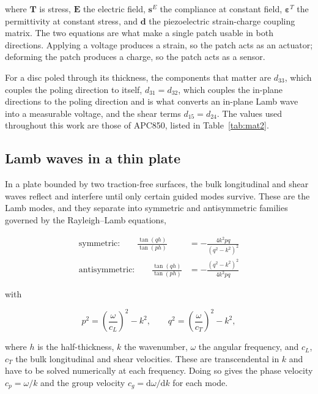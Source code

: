 where $\mathbf{T}$ is stress, $\mathbf{E}$ the electric field, $\mathbf{s}^{E}$ the compliance at constant
field, $\boldsymbol{\varepsilon}^{T}$ the permittivity at constant stress, and $\mathbf{d}$ the piezoelectric
strain-charge coupling matrix. The two equations are what make a single patch usable in both directions.
Applying a voltage produces a strain, so the patch acts as an actuator; deforming the patch produces a charge,
so the patch acts as a sensor.

For a disc poled through its thickness, the components that matter are $d_{33}$, which couples the poling
direction to itself, $d_{31}=d_{32}$, which couples the in-plane directions to the poling direction and is
what converts an in-plane Lamb wave into a measurable voltage, and the shear terms $d_{15}=d_{24}$. The
values used throughout this work are those of APC850, listed in Table~\ref{tab:mat2}.

\subsection{Lamb waves in a thin plate}

In a plate bounded by two traction-free surfaces, the bulk longitudinal and shear waves reflect and interfere
until only certain guided modes survive. These are the Lamb modes, and they separate into symmetric and
antisymmetric families governed by the Rayleigh--Lamb equations,

\begin{align}
  \text{symmetric:}\qquad
  \frac{\tan(qh)}{\tan(ph)} &= -\frac{4k^{2}pq}{\left(q^{2}-k^{2}\right)^{2}} \\[4pt]
  \text{antisymmetric:}\qquad
  \frac{\tan(qh)}{\tan(ph)} &= -\frac{\left(q^{2}-k^{2}\right)^{2}}{4k^{2}pq}
\end{align}

with

\begin{equation}
  p^{2} = \left(\frac{\omega}{c_{L}}\right)^{2} - k^{2}, \qquad
  q^{2} = \left(\frac{\omega}{c_{T}}\right)^{2} - k^{2},
\end{equation}

where $h$ is the half-thickness, $k$ the wavenumber, $\omega$ the angular frequency, and $c_{L}$, $c_{T}$
the bulk longitudinal and shear velocities. These are transcendental in $k$ and have to be solved numerically
at each frequency. Doing so gives the phase velocity $c_{p}=\omega/k$ and the group velocity
$c_{g}=\mathrm{d}\omega/\mathrm{d}k$ for each mode.

